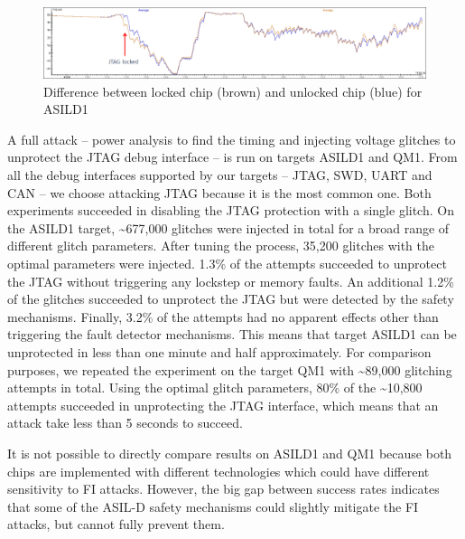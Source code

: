 \documentclass[a4paper, 10pt]{article}
\newcommand{\TI}{ASILD1\xspace}
\newcommand{\NXP}{QM1\xspace}
\begin{document}
\begin{figure}[h]
  \centering
  \includegraphics[width=\textwidth]{tms570-DPA-jtag}
  \caption{Difference between locked chip (brown) and unlocked chip (blue) for \TI}
  \label{fig:jtag2-trace2}
\end{figure}

A full attack -- power analysis to find the timing and injecting voltage glitches to unprotect the JTAG debug interface -- is run on targets \TI and \NXP. From all the debug interfaces supported by our targets -- JTAG, SWD, UART and CAN -- we choose attacking JTAG because it is the most common one. Both experiments succeeded in disabling the JTAG protection with a single glitch. On the \TI target, \textasciitilde677,000 glitches were injected in total for a broad range of different glitch parameters. After tuning the process, 35,200 glitches with the optimal parameters were injected. 1.3\% of the attempts succeeded to unprotect the JTAG without triggering any lockstep or memory faults. An additional 1.2\% of the glitches succeeded to unprotect the JTAG but were detected by the safety mechanisms. Finally, 3.2\% of the attempts had no apparent effects other than triggering the fault detector mechanisms.   %
This means that target \TI can be unprotected in less than one minute and half approximately. For comparison purposes, we repeated the experiment on the target \NXP with \textasciitilde89,000 glitching attempts in total. Using the optimal glitch parameters, 80\% of the \textasciitilde10,800 attempts succeeded in unprotecting the JTAG interface, which means that an attack take less than 5 seconds to succeed.

It is not possible to directly compare results on \TI and \NXP because both chips are implemented with different technologies which could have different sensitivity to FI attacks. However, the big gap between success rates indicates that some of the ASIL-D safety mechanisms could slightly mitigate the FI attacks, but cannot fully prevent them.
\end{document}
